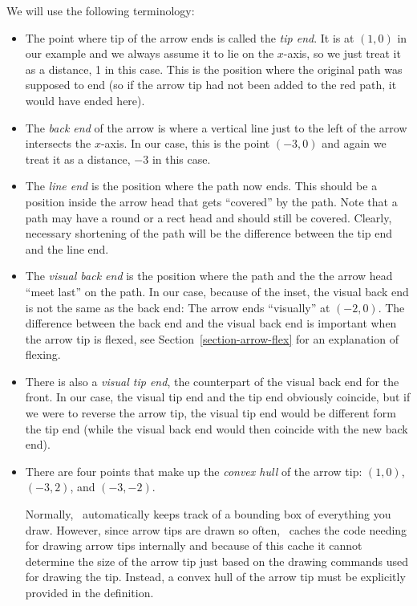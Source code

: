 We will use the following terminology:
\begin{itemize}
\item The point where tip of the arrow ends is called the
  \emph{tip end}. It is at $(1,0)$ in our example and we always
  assume it to lie on the $x$-axis, so we just treat it as a distance,
  1 in this case. This is the position where the original path was
  supposed to end (so if the arrow tip had not been added to the red
  path, it would have ended here).
\item The \emph{back end} of the arrow is where a vertical line just
  to the left of the arrow intersects the $x$-axis. In our case, this
  is the point $(-3,0)$ and again we treat it as a distance, $-3$ in
  this case.
\item The \emph{line end} is the position where the path now
  ends. This should be a position inside the arrow head that gets
  ``covered'' by the path. Note that a path may have a round or a rect
  head and should still be covered. Clearly, necessary shortening of
  the path will be the difference between the tip end and the line
  end.
\item The \emph{visual back end} is the position where the path and
  the the arrow head ``meet last'' on the path. In our case, because
  of the inset, the visual back end is not the same as the back end:
  The arrow ends ``visually'' at $(-2,0)$. The difference between the
  back end and the visual back end is important when the arrow tip is
  flexed, see Section~\ref{section-arrow-flex} for an explanation of
  flexing.
\item There is also a \emph{visual tip end}, the counterpart of the
  visual back end for the front. In our case, the visual tip end and
  the tip end obviously coincide, but if we were to reverse the arrow
  tip, the visual tip end would be different form the tip end (while
  the visual back end would then coincide with the new back end).
\item There are four points that make up the \emph{convex hull} of the
  arrow tip: $(1,0)$, $(-3,2)$, and $(-3,-2)$.

  Normally, \pgfname\ automatically keeps track of a bounding box of
  everything you draw. However, since arrow tips are drawn so often,
  \pgfname\ caches the code needing for drawing arrow tips internally
  and because of this cache it cannot determine the size of the arrow
  tip just based on the drawing commands used for drawing the
  tip. Instead, a convex hull of the arrow tip must be explicitly
  provided in the definition.
\end{itemize}

